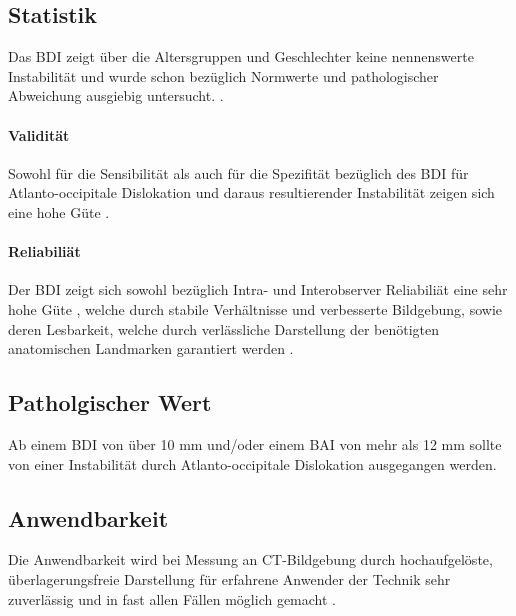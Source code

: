\documentclass{report}
\begin{document}
\subsection{Statistik}
Das BDI zeigt über die Altersgruppen und Geschlechter keine nennenswerte Instabilität \cite{Chaput2011} und wurde schon bezüglich Normwerte und pathologischer Abweichung ausgiebig untersucht.
\cite{Radcliff2010,Radcliff2012,Chang2009,Harris1994,Harris1994a,Chaput2011,Rojas2007,Gonzalez2004,Gonzalez2004a,Dziurzynski2005,Bono2007}. 



\paragraph{Validität}
Sowohl für die Sensibilität als auch für die Spezifität bezüglich des BDI für Atlanto-occipitale Dislokation und daraus resultierender Instabilität zeigen sich eine hohe Güte \cite{Dziurzynski2005}.

\paragraph{Reliabiliät}
Der BDI zeigt sich sowohl bezüglich Intra- und Interobserver Reliabiliät eine sehr hohe Güte \cite{Chaput2011,Dziurzynski2005,Harris1994,Harris1994a}, welche durch stabile Verhältnisse und verbesserte Bildgebung, sowie deren Lesbarkeit, welche durch verlässliche Darstellung der benötigten anatomischen Landmarken garantiert werden \cite{Dziurzynski2005,Radcliff2010}.


\subsection{Patholgischer Wert}
Ab einem BDI von über 10 mm und/oder einem BAI von mehr als 12 mm sollte von einer Instabilität durch Atlanto-occipitale Dislokation ausgegangen werden.


\subsection{Anwendbarkeit}
Die Anwendbarkeit wird bei Messung an CT-Bildgebung durch hochaufgelöste, überlagerungsfreie Darstellung für erfahrene Anwender der Technik sehr zuverlässig und in fast allen Fällen möglich gemacht \cite{Dziurzynski2005,Radcliff2010}. 
\end{document}
